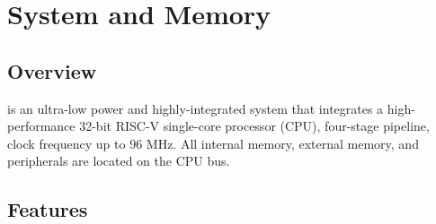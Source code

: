 \documentclass[main\_\_EN.tex]{subfiles}
\begin{document}

\ifglobal
\else
    {\let\clearpage\relax \listoftodos}
    {\let\clearpage\relax \listofdonetodos}
    \tableofcontents
\fi



\hypertarget{sysmem}{}
\chapter{System and Memory}
\label{mod:sysmem}

\section{Overview}

\chipname{} is an ultra-low power and highly-integrated system that integrates a high-performance 32-bit RISC-V single-core processor (CPU), four-stage pipeline, clock frequency up to 96 MHz. All internal memory, external memory, and peripherals are located on the CPU bus.


\section{Features}
\end{document}

